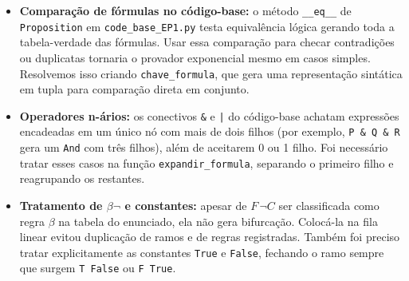 \documentclass{article}
\begin{document}
\begin{itemize}
    \item \textbf{Comparação de fórmulas no código-base:} o método \texttt{\_\_eq\_\_} de \texttt{Proposition} em \texttt{code\_base\_EP1.py} testa equivalência lógica gerando toda a tabela-verdade das fórmulas. Usar essa comparação para checar contradições ou duplicatas tornaria o provador exponencial mesmo em casos simples. Resolvemos isso criando \texttt{chave\_formula}, que gera uma representação sintática em tupla para comparação direta em conjunto.
    \item \textbf{Operadores n-ários:} os conectivos \texttt{\&} e \texttt{|} do código-base achatam expressões encadeadas em um único nó com mais de dois filhos (por exemplo, \texttt{P \& Q \& R} gera um \texttt{And} com três filhos), além de aceitarem 0 ou 1 filho. Foi necessário tratar esses casos na função \texttt{expandir\_formula}, separando o primeiro filho e reagrupando os restantes.
    \item \textbf{Tratamento de $\beta\neg$ e constantes:} apesar de $F\,\neg C$ ser classificada como regra $\beta$ na tabela do enunciado, ela não gera bifurcação. Colocá-la na fila linear evitou duplicação de ramos e de regras registradas. Também foi preciso tratar explicitamente as constantes \texttt{True} e \texttt{False}, fechando o ramo sempre que surgem \texttt{T False} ou \texttt{F True}.
    
\end{itemize}
\end{document}
